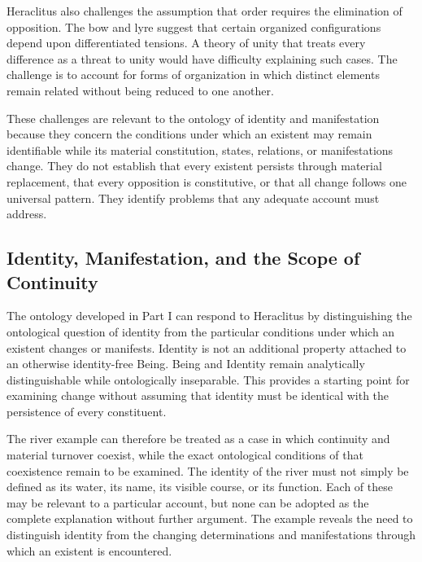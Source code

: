 \label{para:VS.B01.P01.C08.S03.SS08.P003}

Heraclitus also challenges the assumption that
order requires the elimination of opposition.
The bow and lyre suggest that certain organized
configurations depend upon differentiated
tensions. A theory of unity that treats every
difference as a threat to unity would have
difficulty explaining such cases. The challenge
is to account for forms of organization in
which distinct elements remain related without
being reduced to one another.

\label{para:VS.B01.P01.C08.S03.SS08.P004}

These challenges are relevant to the ontology
of identity and manifestation because they
concern the conditions under which an existent
may remain identifiable while its material
constitution, states, relations, or manifestations
change. They do not establish that every
existent persists through material replacement,
that every opposition is constitutive, or that
all change follows one universal pattern.
They identify problems that any adequate
account must address.


\subsection{Identity, Manifestation, and the Scope of Continuity}

\label{para:VS.B01.P01.C08.S03.SS09.P001}

The ontology developed in Part I can respond to
Heraclitus by distinguishing the ontological
question of identity from the particular
conditions under which an existent changes
or manifests. Identity is not an additional
property attached to an otherwise identity-free
Being. Being and Identity remain analytically
distinguishable while ontologically inseparable.
This provides a starting point for examining
change without assuming that identity must
be identical with the persistence of every
constituent.

\label{para:VS.B01.P01.C08.S03.SS09.P002}

The river example can therefore be treated as
a case in which continuity and material turnover
coexist, while the exact ontological conditions
of that coexistence remain to be examined.
The identity of the river must not simply be
defined as its water, its name, its visible
course, or its function. Each of these may
be relevant to a particular account, but none
can be adopted as the complete explanation
without further argument. The example reveals
the need to distinguish identity from the
changing determinations and manifestations
through which an existent is encountered.

